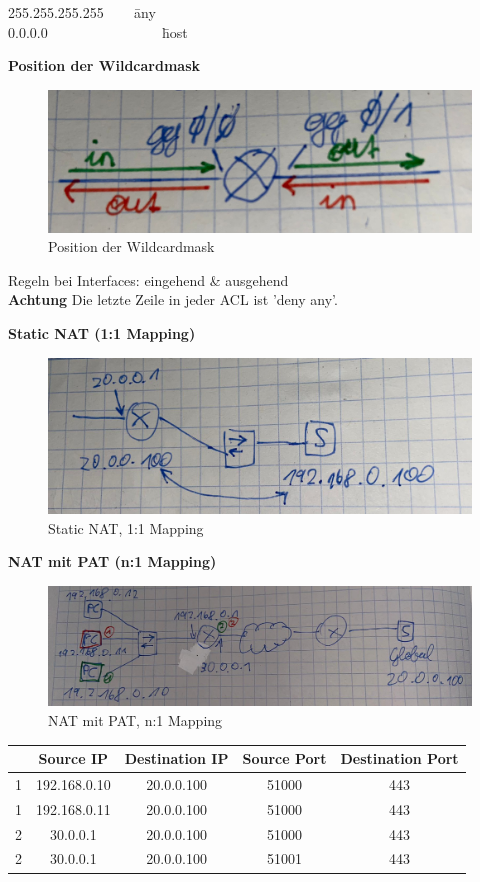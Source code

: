 \begin{tabbing}
	255.255.255.255 ~~~ \= any \\
	0.0.0.0 ~~~~~~~~~~~~~~~ \= host
\end{tabbing}

\textbf{Position der Wildcardmask}
\begin{figure}[H]
	\centering
	\includegraphics[width=0.8\linewidth]{figures/wildcard.jpeg}
	\caption{Position der Wildcardmask}
\end{figure}

Regeln bei Interfaces: eingehend \& ausgehend \\
\textbf{Achtung} Die letzte Zeile in jeder ACL ist 'deny any'.

\textbf{Static NAT (1:1 Mapping)} \\
\begin{figure}[H]
	\centering
	\includegraphics[width=0.8\linewidth]{figures/static_nat.jpeg}
	\caption{Static NAT, 1:1 Mapping}
\end{figure}

\textbf{NAT mit PAT (n:1 Mapping)}
\begin{figure}[H]
	\centering
	\includegraphics[width=0.8\linewidth]{figures/pat_nat.jpeg}
	\caption{NAT mit PAT, n:1 Mapping}
\end{figure}

\begin{table}[H]
	\begin{tabular}{c|cccc}
		& Source IP & Destination IP & Source Port & Destination Port \\
		\hline
		{\color[HTML]{32CB00} 1} & 192.168.0.10 & 20.0.0.100 & 51000 & 443 \\
		{\color[HTML]{FE0000} 1} & 192.168.0.11 & 20.0.0.100 & 51000 & 443 \\
		{\color[HTML]{32CB00} 2} & 30.0.0.1 & 20.0.0.100 & 51000 & 443 \\
		{\color[HTML]{FE0000} 2} & 30.0.0.1 & 20.0.0.100 & 51001 & 443
	\end{tabular}
\end{table}

